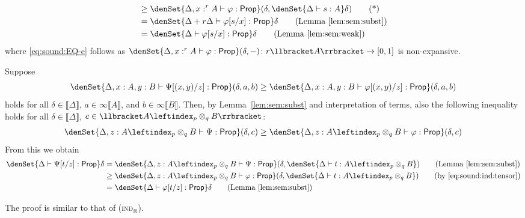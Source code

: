\documentclass[a4paper,UKenglish,cleveref, autoref, thm-restate]{lipics-v2021}
\newcommand{\mprod}{\otimes}
\newcommand{\uinterval}{[0,1]}
\newcommand{\pair}[2]{\otimes_{#1,#2}}
\renewcommand{\pair}[2]{\leftindex_{#1}\otimes_{#2}} %
\newcommand{\ts}{\vdash}
\newcommand{\hastype}[3]{#1\ts #2 : #3}
\newcommand{\Prop}{\mathsf{Prop}}
\newcommand{\den}[1]{\llbracket #1\rrbracket}
\begin{document}
\begin{description}[font=\sc,wide]
\begin{align*}
        &\geq \denSet{\hastype{\Delta,x:^rA}{\varphi}{\Prop}}
            (\delta,\denSet{\hastype{\Delta}{s}{A}}\delta)
        \tag{*} \label{eq:sound:EQ-e} \\
        &= \denSet{\hastype{\Delta+r\Delta}{\varphi[s/x]}{\Prop}}\delta
        \tag{Lemma~\ref{lem:sem:subst}} \\
        &= \denSet{\hastype{\Delta}{\varphi[s/x]}{\Prop}}\delta
        \tag{Lemma~\ref{lem:sem:weak}}
    \end{align*}
    where \eqref{eq:sound:EQ-e} follows as $\denSet{\hastype{\Delta,x:^rA}{\varphi}{\Prop}}(\delta, -) \colon r\den{A} \to \uinterval$ is non-expansive.

    \item[Rule (ind${}_\mprod$):] Suppose 
    \[\denSet{\hastype{\Delta,x:A,y:B}{\Psi[(x,y)/z]}{\Prop}}(\delta,a,b)
    \geq \denSet{\hastype{\Delta,x:A,y:B}{\varphi[(x,y)/z]}{\Prop}}(\delta,a,b)\] 
    holds for all
    $\delta \in \den{\Delta}$, $a \in \infty\den A$, and $b \in \infty\den B$. Then, by Lemma~\ref{lem:sem:subst} and interpretation of terms, also the following 
    inequality holds for all $\delta \in \den{\Delta}$, $c \in \den {A \pair{p}{q} B}$:
    \begin{equation}
    \label{eq:sound:ind:tensor}
        \denSet{\hastype{\Delta,z: A \pair{p}{q} B}{\Psi}{\Prop}}(\delta,c)
    \geq \denSet{\hastype{\Delta,z: A \pair{p}{q} B}{\varphi}{\Prop}}(\delta,c)
    \end{equation}
    From this we obtain
    \begin{align*}
        \denSet{\hastype{\Delta}{\Psi[t/z]}{\Prop}}\delta
        &= \denSet{\hastype{\Delta,z: A \pair{p}{q} B}{\Psi}{\Prop}}
        (\delta,\denSet{\hastype{\Delta}{t}{A \pair{p}{q} B}}) 
        \tag{Lemma~\ref{lem:sem:subst}} \\
        &\geq \denSet{\hastype{\Delta,z: A \pair{p}{q} B}{\varphi}{\Prop}}
        (\delta,\denSet{\hastype{\Delta}{t}{A \pair{p}{q} B}})
        \tag{by \eqref{eq:sound:ind:tensor}} \\
        &=\denSet{\hastype{\Delta}{\varphi[t/z]}{\Prop}}\delta
        \tag{Lemma~\ref{lem:sem:subst}}
    \end{align*}

    \item[Rule (ind$_+$):] The proof is similar to that of (\textsc{ind}${}_\mprod$).


\end{description}
\end{document}

